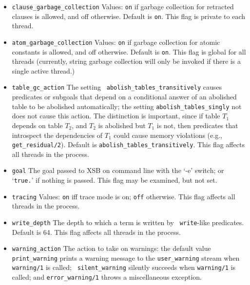 \begin{description}
\begin{itemize}
%
\item {\tt clause\_garbage\_collection} Values: {\tt on} if garbage
  collection for retracted clauses is allowed, and off
  otherwise. Default is {\tt on}.  This flag is private to each
  thread.
%
\item {\tt atom\_garbage\_collection} Values: {\tt on} if garbage
  collection for atomic constants is allowed, and off
  otherwise. Default is {\tt on}.  This flag is global for all threads
  (currently, string garbage collection will only be invoked if there
  is a single active thread.)

%
\item {\tt table\_gc\_action} The setting {\tt
  abolish\_tables\_transitively} causes predicates or subgoals that
  depend on a conditional answer of an abolished table to be abolished
  automatically; the setting {\tt abolish\_tables\_singly} not does
  not cause this action.  The distinction is important, since if table
  $T_1$ depends on table $T_2$, and $T_2$ is abolished but $T_1$ is
  not, then predicates that introspect the dependencies of $T_1$ could
  cause memory violations (e.g., {\tt get\_residual/2}).  Default is
  {\tt abolish\_tables\_transitively}.  This flag affects all threads
  in the process.
%
\item {\tt goal}  The goal passed to XSB on command line with the `-e'
switch; or `{\tt true.}' if nothing is passed.  This flag may be
examined, but not set. 
%
\item {\tt tracing}  Values: {\tt on} iff trace mode is on; {\tt off}
otherwise. This flag affects all threads in the process. 
%
\item {\tt write\_depth}  The depth to which a term is written by {\tt
  write}-like predicates.  Default is 64.  This flag affects all
threads in the process.  

\item {\tt warning\_action} The action to take on warnings: the
  default value {\tt print\_warning} prints a warning message to the
  {\tt user\_warning} stream when {\tt warning/1} is called; {\tt
    silent\_warning} silently succeeds when {\tt warning/1} is called;
  and {\tt error\_warning/1} throws a miscellaneous exception.


\end{itemize}
\end{description}
